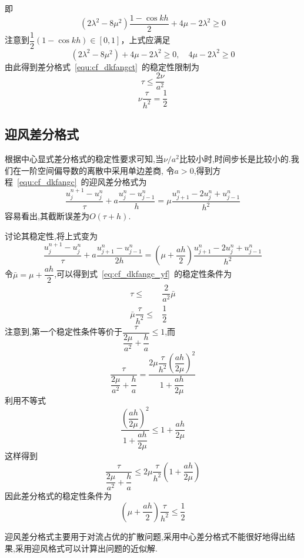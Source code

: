 即
\begin{equation}
(2\lambda^2-8\mu^2)\dfrac{1-\cos kh}{2}+4\mu-2\lambda^2 \geq 0
\end{equation}
注意到$\dfrac{1}{2}(1-\cos kh)\in[0,1]$，上式应满足
\begin{equation}
(2\lambda^2-8\mu^2)+4\mu-2\lambda^2 \geq 0,\quad 4\mu-2\lambda^2 \geq 0
\end{equation}
由此得到差分格式~\eqref{equ:cf_dkfangct}~的稳定性限制为
\begin{equation}
\tau \leq \dfrac{2\nu}{a^2}
\end{equation}
\begin{equation}
\nu\dfrac{\tau}{h^2}=\dfrac{1}{2}
\end{equation}\par
\subsection{迎风差分格式}
根据中心显式差分格式的稳定性要求可知,当$\nu/a^2$比较小时,时间步长是比较小的.我们在一阶空间偏导数的离散中采用单边差商,
令$a>0$,得到方程~\eqref{equ:cf_dkfangc}~的迎风差分格式为
\begin{equation}\label{eq:cf_dkfangc_yf}
 \dfrac{u_j^{n+1}-u_j^n}{\tau}+a\dfrac{u_j^n-u_{j-1}^n}{h}=\mu\dfrac{u_{j+1}^n-2u_j^n+u_{j-1}^{n}}{h^2}
\end{equation}
容易看出,其截断误差为$O(\tau+h)$.\par
讨论其稳定性,将上式变为
\begin{equation}
 \dfrac{u_j^{n+1}-u_j^n}{\tau}+a\dfrac{u_{j+1}^n-u_{j-1}^n}{2h} = \left(\mu+\dfrac{ah}{2}\right)
 \dfrac{u_{j+1}^{n}-2u_j^n+u_{j-1}^n}{h^2}
\end{equation}
令$\bar{\mu}=\mu+\dfrac{ah}{2}$,可以得到式~\eqref{eq:cf_dkfangc_yf}~的稳定性条件为
\begin{equation*}
\begin{split}
  \tau\leq&\dfrac{2}{a^2}\bar{\mu} \\[0.7em]
  \bar{\mu}\dfrac{\tau}{h^2}\leq&\dfrac{1}{2}
\end{split}
\end{equation*}
注意到,第一个稳定性条件等价于$\dfrac{\tau}{\dfrac{2\mu}{a^2}+\dfrac{h}{a}}\leq 1$,而
\begin{equation*}
\dfrac{\tau}{\dfrac{2\mu}{a^2}+\dfrac{h}{a}}=\dfrac{2\mu\dfrac{\tau}{h^2}\left(\dfrac{ah}{2\mu}\right)^2}{1+\dfrac{ah}{2\mu}}
\end{equation*}
利用不等式
\begin{equation*}
\dfrac{\left(\dfrac{ah}{2\mu}\right)^2}{1+\dfrac{ah}{2\mu}}\leq 1+\dfrac{ah}{2\mu}
\end{equation*}
这样得到
\begin{equation*}
\dfrac{\tau}{\dfrac{2\mu}{a^2}+\dfrac{h}{a}}\leq 2\mu\dfrac{\tau}{h^2}\left(1+\dfrac{ah}{2\mu}\right)
\end{equation*}
因此差分格式的稳定性条件为
\begin{equation}
 \left(\mu+\dfrac{ah}{2}\right)\dfrac{\tau}{h^2}\leq\dfrac{1}{2}
\end{equation}\par
迎风差分格式主要用于对流占优的扩散问题,采用中心差分格式不能很好地得出结果,采用迎风格式可以计算出问题的近似解.
